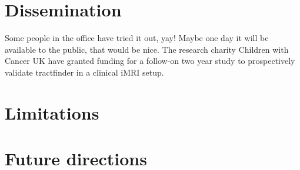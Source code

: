 \section{Dissemination}


Some people in the office have tried it out, yay!
Maybe one day it will be available to the public, that would be nice.
The research charity Children with Cancer UK have granted funding for a follow-on two year study to prospectively validate tractfinder in a clinical iMRI setup.

\section{Limitations}


\section{Future directions}

